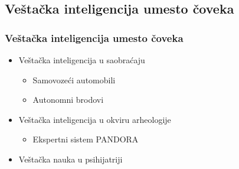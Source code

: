 \documentclass{beamer}
\begin{document}
\subsection{Veštačka inteligencija umesto čoveka}
\begin{frame}[fragile]\frametitle{Veštačka inteligencija umesto čoveka}
\begin{itemize}
    \item Veštačka inteligencija u saobraćaju
    \begin{itemize}
        \item Samovozeći automobili
        \item Autonomni brodovi
    \end{itemize}
    \item Veštačka inteligencija u okviru arheologije
    \begin{itemize}
        \item Ekspertni sistem PANDORA
    \end{itemize}
    \item Veštačka nauka u psihijatriji
\end{itemize}

\end{frame}
\end{document}
